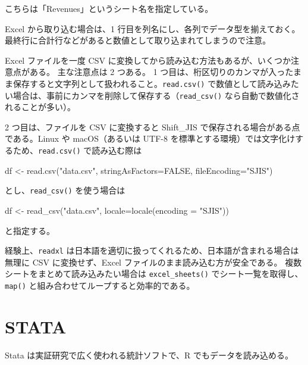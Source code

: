 \documentclass[
  letterpaper,
  xelatex,
  ja=standard, xelatex]{bxjsbook}
\newenvironment{Shaded}{\begin{snugshade}}{\end{snugshade}}
\newcommand{\AttributeTok}[1]{\textcolor[rgb]{0.40,0.45,0.13}{#1}}
\newcommand{\ConstantTok}[1]{\textcolor[rgb]{0.56,0.35,0.01}{#1}}
\newcommand{\FunctionTok}[1]{\textcolor[rgb]{0.28,0.35,0.67}{#1}}
\newcommand{\NormalTok}[1]{\textcolor[rgb]{0.00,0.23,0.31}{#1}}
\newcommand{\OtherTok}[1]{\textcolor[rgb]{0.00,0.23,0.31}{#1}}
\newcommand{\StringTok}[1]{\textcolor[rgb]{0.13,0.47,0.30}{#1}}
\begin{document}
こちらは「Revenues」というシート名を指定している。

Excel から取り込む場合は、1
行目を列名にし、各列でデータ型を揃えておく。最終行に合計行などがあると数値として取り込まれてしまうので注意。

Excel ファイルを一度 CSV
に変換してから読み込む方法もあるが、いくつか注意点がある。 主な注意点は
2 つある。 1
つ目は、桁区切りのカンマが入ったまま保存すると文字列として扱われること。\texttt{read.csv()}
で数値として読み込みたい場合は、事前にカンマを削除して保存する（\texttt{read\_csv()}
なら自動で数値化されることが多い）。

2 つ目は、ファイルを CSV に変換すると Shift\_JIS
で保存される場合がある点である。Linux や macOS（あるいは UTF-8
を標準とする環境）では文字化けするため、\texttt{read.csv()}
で読み込む際は

\begin{Shaded}
\begin{Highlighting}[]
\NormalTok{df }\OtherTok{\textless{}{-}} \FunctionTok{read.csv}\NormalTok{(}\StringTok{"data.csv"}\NormalTok{, }\AttributeTok{stringAsFactors=}\ConstantTok{FALSE}\NormalTok{, }\AttributeTok{fileEncoding=}\StringTok{"SJIS"}\NormalTok{)}
\end{Highlighting}
\end{Shaded}

とし、\texttt{read\_csv()} を使う場合は

\begin{Shaded}
\begin{Highlighting}[]
\NormalTok{df }\OtherTok{\textless{}{-}} \FunctionTok{read\_csv}\NormalTok{(}\StringTok{"data.csv"}\NormalTok{, }\AttributeTok{locale=}\FunctionTok{locale}\NormalTok{(}\AttributeTok{encoding =} \StringTok{"SJIS"}\NormalTok{))}
\end{Highlighting}
\end{Shaded}

と指定する。

経験上、\texttt{readxl}
は日本語を適切に扱ってくれるため、日本語が含まれる場合は無理に CSV
に変換せず、Excel ファイルのまま読み込む方が安全である。
複数シートをまとめて読み込みたい場合は \texttt{excel\_sheets()}
でシート一覧を取得し、\texttt{map()}
と組み合わせてループすると効率的である。

\section{STATA}\label{stata}

Stata は実証研究で広く使われる統計ソフトで、R でもデータを読み込める。
\end{document}
